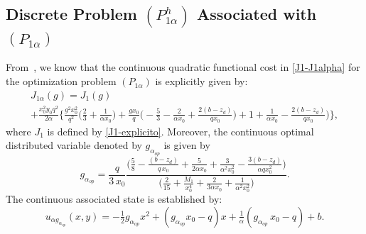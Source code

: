 \documentclass[axioms,article,submit,moreauthors]{Definitions/mdpi}
\begin{document}
\subsection{Discrete Problem  ${(P^h_{1\alpha})}$ Associated with $(P_{1\alpha})$}

From~\cite{BoGaTa2020}, we know that  the continuous quadratic functional cost in \eqref{J1-J1alpha} for the optimization problem $(P_{1\alpha})$ is explicitly given by: 
      \begin{equation}\label{J1alpha-explicito}
      \begin{array}{ll}
          J_{1\alpha}(g)= J_1(g) \\
          + \tfrac{x_0^2 y_0 q^2}{2\alpha} \Bigg\{\tfrac{g^2 x_0^2}{q^2} \Big(\tfrac{2 }{3} + \tfrac{1}{\alpha x_0} \Big) + 
          \tfrac{g x_0}{q} \Big( - \tfrac{5 }{3} - \tfrac{2}{\alpha x_0} +\tfrac{2 (b-z_d)}{q x_0}\Big) + 1+\tfrac{1}{\alpha x_0}-\tfrac{2(b-z_d)}{qx_0}\Big) \Bigg\},
          \end{array}
      \end{equation}
      where $J_1$ is defined by \eqref{J1-explicito}.
      Moreover, the continuous optimal distributed variable denoted by $g_{\alpha_{op}}$ is {given by}
\begin{equation}\label{galphaop}
          g_{\alpha_{op}} = \frac{q}{3\, x_0} \frac{\Big( \tfrac{5}{8 } -\tfrac{ (b -z_d)}{q \, x_0}+\tfrac{5}{2\alpha x_0}+\tfrac{3}{\alpha^2x_0^2}-\tfrac{3(b-z_d)}{\alpha q x_0^2}\Big)}{\Big(\tfrac{2}{15} + \tfrac{M_1}{x_0^4}+\tfrac{2}{3\alpha x_0}+\tfrac{1}{\alpha^2 x_0^2} \Big)}.
     \end{equation}
\noindent The continuous associated state is established by: 
     \begin{equation}\label{ualpha-galphaop}
            u_{\alpha g_{\alpha_{op}}}(x,y) = -\tfrac{1}{2} g_{\alpha_{op}} x^2 + (g_{\alpha_{op}} x_0 - q) x + \tfrac{1}{\alpha} (g_{\alpha_{op}}\,x_0 - q) +b.
       \end{equation}
       
\end{document}
